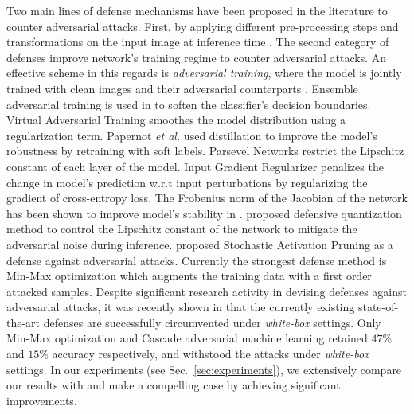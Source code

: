 \documentclass[10pt,twocolumn,letterpaper]{article}
\begin{document}
Two main lines of defense mechanisms have been proposed in the literature to counter adversarial attacks. First, by applying different pre-processing steps and transformations on the input image at inference time \cite{xie2017mitigating,guo2017countering}. The second category of defenses improve network's training regime to counter adversarial attacks. An effective scheme in this regards is \textit{adversarial training}, where the model is jointly trained with clean images and their adversarial counterparts \cite{kurakin2016adversarial_2, 43405}. Ensemble adversarial training is used in \cite{tramer2017ensemble} to soften the classifier's decision boundaries. Virtual Adversarial Training \cite{miyato2015distributional} smoothes the model distribution using a regularization term. Papernot \textit{et al.} \cite{papernot2016distillation} used distillation to improve the model's robustness by retraining with soft labels. Parsevel Networks \cite{cisse2017parseval} restrict the Lipschitz constant of each layer of the model. Input Gradient Regularizer \cite{ross2018improving} penalizes the change in model's prediction w.r.t input perturbations by regularizing the gradient of cross-entropy loss. The Frobenius norm of the Jacobian of the network has been shown to improve model's stability in \cite{jakubovitz2018improving}. \cite{lin2018defensive} proposed defensive quantization method to control the Lipschitz constant of the network to mitigate the adversarial noise during inference. \cite{dhillon2018stochastic} proposed Stochastic Activation Pruning as a defense against adversarial attacks. Currently the strongest defense method is Min-Max optimization \cite{madry2017towards} which augments the training data with a first order attacked samples. Despite significant research activity in devising defenses against adversarial attacks, it was recently shown in \cite{athalye2018obfuscated} that the currently existing state-of-the-art defenses \cite{kolter2017provable,raghunathan2018certified,sinha2017certifiable} are successfully circumvented under \textit{white-box} settings. Only Min-Max optimization \cite{madry2017towards} and Cascade adversarial machine learning \cite{na2017cascade} retained $47\%$ and $15\%$ accuracy respectively, and withstood the attacks under \textit{white-box} settings. In our experiments (see Sec.~\ref{sec:experiments}), we extensively compare our results with \cite{madry2017towards} and make a compelling case by achieving significant improvements.
\end{document}
